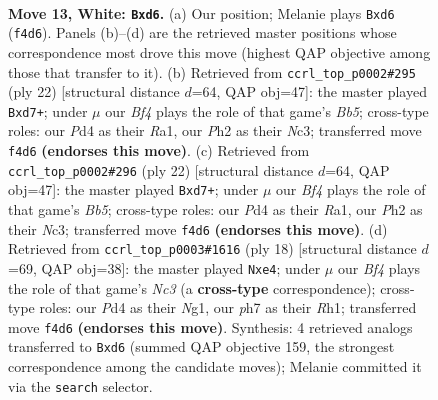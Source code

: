 \documentclass[11pt]{article}
\begin{document}
\clearpage

\begin{figure}[p]\centering
\begin{subfigure}{0.46\textwidth}\centering
\resizebox{\linewidth}{!}{%
\newchessgame
\chessboard[
  setfen={r2qk2r/ppp2ppp/2bbp3/8/2PP1B2/5N2/PP2KPPP/R2Q3R w kq - 2 13},
  showmover=false,
  pgfstyle=straightmove, color=movearrow, markmove={f4-d6}
]}
\caption{}
\end{subfigure}\hfill
\begin{subfigure}{0.46\textwidth}\centering
\resizebox{\linewidth}{!}{%
\newchessgame
\chessboard[
  setfen={r2qk2r/pp1bpp1p/6pb/1B6/3P4/2N3P1/PP3P1P/R2QK2R w KQkq - 0 12},
  showmover=false,
  pgfstyle=straightmove, color=movearrow, markmove={b5-d7}
]}
\caption{}
\end{subfigure}
\\[4pt]
\begin{subfigure}{0.46\textwidth}\centering
\resizebox{\linewidth}{!}{%
\newchessgame
\chessboard[
  setfen={r2qk2r/pp1bpp1p/6pb/1B6/3P4/2N3P1/PP3P1P/R2QK2R w KQkq - 0 12},
  showmover=false,
  pgfstyle=straightmove, color=movearrow, markmove={b5-d7}
]}
\caption{}
\end{subfigure}\hfill
\begin{subfigure}{0.46\textwidth}\centering
\resizebox{\linewidth}{!}{%
\newchessgame
\chessboard[
  setfen={rn1qk2r/pp2bppp/2p5/3p4/3PbB2/2N1P3/PP3PPP/R2QK1NR w KQkq - 0 10},
  showmover=false,
  pgfstyle=straightmove, color=movearrow, markmove={c3-e4}
]}
\caption{}
\end{subfigure}
\caption{\textbf{Move 13, White: \texttt{Bxd6}.} (a) Our position; Melanie plays \texttt{Bxd6} (\texttt{f4d6}). Panels (b)--(d) are the retrieved master positions whose correspondence most drove this move (highest QAP objective among those that transfer to it). (b) Retrieved from \texttt{ccrl\_top\_p0002\#295} (ply 22) [structural distance $d$=64, QAP obj=47]: the master played \texttt{Bxd7+}; under $\mu$ our \emph{Bf4} plays the role of that game's \emph{Bb5}; cross-type roles: our \emph{P}d4 as their \emph{R}a1, our \emph{P}h2 as their \emph{N}c3; transferred move \texttt{f4d6} \textbf{(endorses this move)}. (c) Retrieved from \texttt{ccrl\_top\_p0002\#296} (ply 22) [structural distance $d$=64, QAP obj=47]: the master played \texttt{Bxd7+}; under $\mu$ our \emph{Bf4} plays the role of that game's \emph{Bb5}; cross-type roles: our \emph{P}d4 as their \emph{R}a1, our \emph{P}h2 as their \emph{N}c3; transferred move \texttt{f4d6} \textbf{(endorses this move)}. (d) Retrieved from \texttt{ccrl\_top\_p0003\#1616} (ply 18) [structural distance $d$=69, QAP obj=38]: the master played \texttt{Nxe4}; under $\mu$ our \emph{Bf4} plays the role of that game's \emph{Nc3} (a \textbf{cross-type} correspondence); cross-type roles: our \emph{P}d4 as their \emph{N}g1, our \emph{p}h7 as their \emph{R}h1; transferred move \texttt{f4d6} \textbf{(endorses this move)}. Synthesis: 4 retrieved analogs transferred to \texttt{Bxd6} (summed QAP objective 159, the strongest correspondence among the candidate moves); Melanie committed it via the \texttt{search} selector.}
\label{fig:thought-m24}
\end{figure}
\end{document}
